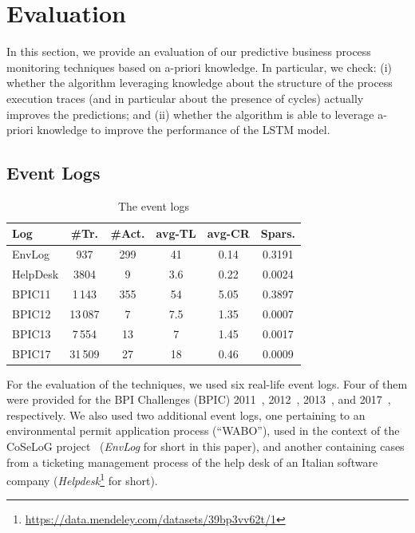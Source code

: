 
\section{Evaluation} %
\label{sec:evaluation}

In this section, we provide an evaluation of our predictive business process monitoring techniques based on a-priori knowledge. In particular, we check: (i) whether the \nocycle algorithm leveraging knowledge about the structure of the process execution traces (and in particular about the presence of cycles) actually improves the predictions; and (ii) whether the \protrack algorithm is able to leverage a-priori knowledge to improve the performance of the LSTM model.

\subsection{Event Logs}
\label{ssec:datasets}

\begin{table}[t]
	\centering
	 \begin{scriptsize}
	\begin{tabular}{l|c|c|c|c|c}
		\toprule
		\textbf{Log} &\textbf{\#Tr.}  & \textbf{\#Act.}  & \textbf{avg-TL} & \textbf{avg-CR}  & \textbf{Spars.}\\
		\midrule
		EnvLog      & 937    & 299   & 41      & 0.14 & 0.3191 \\
		HelpDesk    & 3804   & 9     & 3.6       & 0.22 & 0.0024 \\
		BPIC11       & 1\,143    & 355   & 54       & 5.05 & 0.3897 \\
		BPIC12       & 13\,087   & 7     & 7.5     & 1.35 & 0.0007 \\
		BPIC13       & 7\,554   & 13    & 7       & 1.45 & 0.0017 \\
		BPIC17       & 31\,509  & 27    & 18     & 0.46 & 0.0009 \\
		\bottomrule
	\end{tabular}
	\end{scriptsize}
	\caption{The event logs}
	\label{table:dataset}
\end{table}

For the evaluation of the techniques, we used six real-life event logs. Four of them were provided for the BPI Challenges (BPIC) 2011~\cite{bpichallenge2011}, 2012~\cite{bpichallenge2012}, 2013~\cite{bpichallenge2013}, and 2017~\cite{bpichallenge2017}, respectively. We also used two additional event logs, one pertaining to an environmental permit application process (``WABO''), used in the context of the CoSeLoG project~\cite{EnvironmentalLog} (\emph{EnvLog} for short in this paper), and another containing cases from a ticketing management process of the help desk of an Italian software company (\emph{Helpdesk}\footnote{\url{https://data.mendeley.com/datasets/39bp3vv62t/1}} for short).

